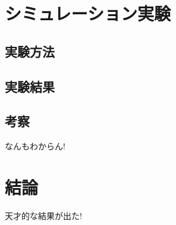 \documentclass[main]{subfiles}
\begin{document}
\newpage
\chapter{シミュレーション実験}
\section{実験方法}
\section{実験結果}
\section{考察}
なんもわからん!

\newpage
\chapter{結論}
天才的な結果が出た!
\end{document}
